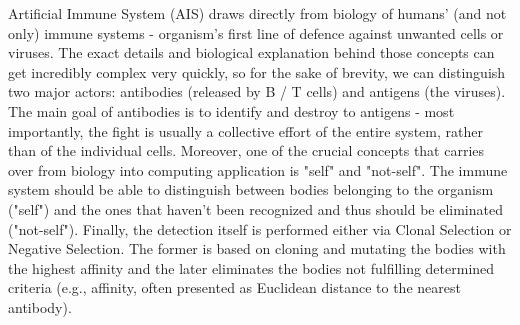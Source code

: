 \documentclass[letterpaper, 10 pt, conference]{ieeeconf}  %
\begin{document}
Artificial Immune System (AIS) draws directly from biology of humans' (and not only) immune systems - organism's first line of defence against unwanted cells or viruses. The exact details and biological explanation behind those concepts can get incredibly complex very quickly, so for the sake of brevity, we can distinguish two major actors: antibodies (released by B / T cells) and antigens (the viruses). The main goal of antibodies is to identify and destroy to antigens - most importantly, the fight is usually a collective effort of the entire system, rather than of the individual cells. Moreover, one of the crucial concepts that carries over from biology into computing application is "self" and "not-self". The immune system should be able to distinguish between bodies belonging to the organism ("self") and the ones that haven't been recognized and thus should be eliminated ("not-self"). Finally, the detection itself is performed either via Clonal Selection or Negative Selection. The former is based on cloning and mutating the bodies with the highest affinity and the later eliminates the bodies not fulfilling determined criteria (e.g., affinity, often presented as Euclidean distance to the nearest antibody).
\end{document}
